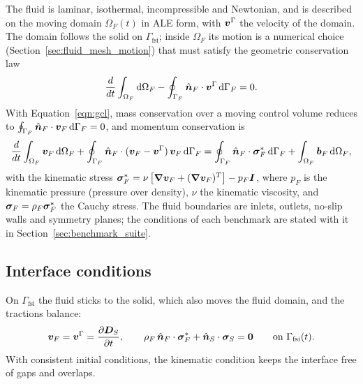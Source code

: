 The fluid is laminar, isothermal, incompressible and Newtonian, and is described on the moving domain $\Omega_F(t)$ in ALE form, with $\boldsymbol{v}^\Gamma$ the velocity of the domain.
The domain follows the solid on $\Gamma_\text{fsi}$; inside $\Omega_F$ its motion is a numerical choice (Section~\ref{sec:fluid_mesh_motion}) that must satisfy the geometric conservation law
\begin{equation}
    \frac{d}{dt} \int_{\Omega_F} \text{d}\Omega_F - \oint_{\Gamma_F} \hat{\boldsymbol{n}}_F \cdot \boldsymbol{v}^\Gamma \, \text{d}\Gamma_F = 0 .
    \label{eqn:gcl}
\end{equation}
With Equation~\eqref{eqn:gcl}, mass conservation over a moving control volume reduces to $\oint_{\Gamma_F} \hat{\boldsymbol{n}}_F \cdot \boldsymbol{v}_F \, \text{d}\Gamma_F = 0$, and momentum conservation is
\begin{equation}
    \frac{d}{dt} \int_{\Omega_F} \boldsymbol{v}_F \, \text{d}\Omega_F
    + \oint_{\Gamma_F} \hat{\boldsymbol{n}}_F \cdot (\boldsymbol{v}_F - \boldsymbol{v}^\Gamma)\, \boldsymbol{v}_F \, \text{d}\Gamma_F
    = \oint_{\Gamma_F} \hat{\boldsymbol{n}}_F \cdot \boldsymbol{\sigma}_F^* \, \text{d}\Gamma_F
    + \int_{\Omega_F} \boldsymbol{b}_F \, \text{d}\Omega_F,
    \label{eqn:fluid_momentum_ale}
\end{equation}
with the kinematic stress $\boldsymbol{\sigma}_F^* = \nu\left[\boldsymbol{\nabla}\boldsymbol{v}_F + (\boldsymbol{\nabla}\boldsymbol{v}_F)^T\right] - p_F \boldsymbol{I}$, where $p_F$ is the kinematic pressure (pressure over density), $\nu$ the kinematic viscosity, and $\boldsymbol{\sigma}_F = \rho_F \boldsymbol{\sigma}_F^*$ the Cauchy stress.
The fluid boundaries are inlets, outlets, no-slip walls and symmetry planes; the conditions of each benchmark are stated with it in Section~\ref{sec:benchmark_suite}.

\subsection{Interface conditions}
\label{sec:fsi_interface}

On $\Gamma_\text{fsi}$ the fluid sticks to the solid, which also moves the fluid domain, and the tractions balance:
\begin{equation}
    \boldsymbol{v}_F = \boldsymbol{v}^\Gamma = \frac{\partial \boldsymbol{D}_S}{\partial t},
    \qquad
    \rho_F \, \hat{\boldsymbol{n}}_F \cdot \boldsymbol{\sigma}_F^* + \hat{\boldsymbol{n}}_S \cdot \boldsymbol{\sigma}_S = \boldsymbol{0}
    \qquad \text{on } \Gamma_\text{fsi}(t).
    \label{eqn:kinematic_interface}
\end{equation}
With consistent initial conditions, the kinematic condition keeps the interface free of gaps and overlaps.

